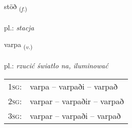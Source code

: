 \documentclass[frontgrid, backgrid]{flacards}\usepackage[]{graphicx}\usepackage[]{xcolor}
\begin{document}
\renewcommand{\blhead}{\vskip5pt {\small\bfseries\footnotesize Nafnorð | Noun }}
\renewcommand{\bcfoot}{\vskip5pt \hspace{2pt}{\small\bfseries\footnotesize 2K}}


{stöð \small{\textsubscript{(\textit{f.})}} \\[1ex] %
\textphonetic{[stœːð]} \\
pl.: \emph{stacja} \\  [2ex]
\renewcommand*{\arraystretch}{0.8}
}

\renewcommand{\flhead}{\vskip5pt \fboxsep=0pt {\small\bfseries\footnotesize Sagnorð | Verb}}
\renewcommand{\fcfoot}{\vskip5pt \fboxsep=0pt \hspace{2pt}{\small\bfseries\footnotesize 2K}}

\renewcommand{\blhead}{\vskip5pt {\small\bfseries\footnotesize Sagnorð | Verb }}
\renewcommand{\bcfoot}{\vskip5pt \hspace{2pt}{\small\bfseries\footnotesize 2K}}


{varpa \small{\textsubscript{(\textit{v.})}} \\[1ex] %
\textphonetic{[var̥pa]} \\
pl.: \emph{rzucić światło na, iluminować} \\  [2ex]
\renewcommand*{\arraystretch}{0.8}
\begin{tabular}{p{1cm}l}
\textsc{1sg}: & varpa -- varpaði -- varpað \\ 
\textsc{2sg}: & varpar -- varpaðir -- varpað \\ 
\textsc{3sg}: & varpar -- varpaði -- varpað \\ 
\end{tabular}
}

\renewcommand{\flhead}{\vskip5pt \fboxsep=0pt {\small\bfseries\footnotesize Lýsingarorð | Adjective}}
\renewcommand{\fcfoot}{\vskip5pt \fboxsep=0pt \hspace{2pt}{\small\bfseries\footnotesize 2K}}
\end{document}

